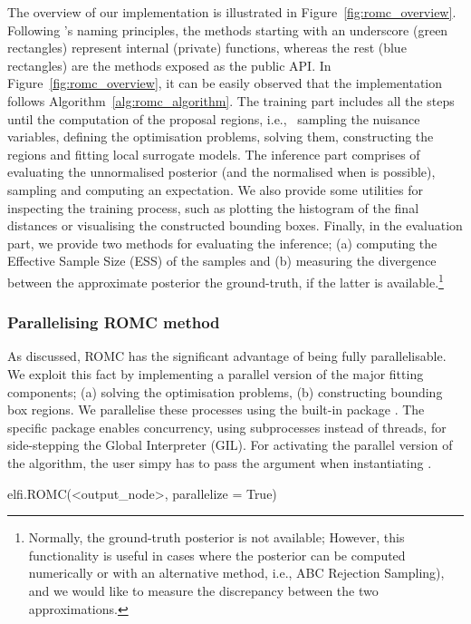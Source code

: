 

The overview of our implementation is illustrated in
Figure~\ref{fig:romc_overview}. Following 's naming
principles, the methods starting with an underscore (green rectangles)
represent internal (private) functions, whereas the rest (blue
rectangles) are the methods exposed as the public API. In
Figure~\ref{fig:romc_overview}, it can be easily observed that the
implementation follows Algorithm~\ref{alg:romc_algorithm}. The
training part includes all the steps until the computation of the
proposal regions, i.e., ~sampling the nuisance variables, defining the
optimisation problems, solving them, constructing the regions and
fitting local surrogate models. The inference part comprises of
evaluating the unnormalised posterior (and the normalised when is
possible), sampling and computing an expectation. We also provide some
utilities for inspecting the training process, such as plotting the
histogram of the final distances or visualising the constructed
bounding boxes. Finally, in the evaluation part, we provide two
methods for evaluating the inference; (a) computing the Effective
Sample Size (ESS) of the samples and (b) measuring the divergence
between the approximate posterior the ground-truth, if the latter is
available.\footnote{Normally, the ground-truth posterior is not
  available; However, this functionality is useful in cases where the
  posterior can be computed numerically or with an alternative method,
  i.e., ABC Rejection Sampling), and we would like to measure the
  discrepancy between the two approximations.}

\subsubsection*{Parallelising ROMC method}

As discussed, ROMC has the significant advantage of being fully
parallelisable. We exploit this fact by implementing a parallel
version of the major fitting components; (a) solving the optimisation
problems, (b) constructing bounding box regions. We parallelise these
processes using the built-in  package
. The specific package enables concurrency, using
subprocesses instead of threads, for side-stepping the Global
Interpreter (GIL). For activating the parallel version of the
algorithm, the user simpy has to pass the argument
 when instantiating .

\begin{Code}
elfi.ROMC(<output_node>, parallelize = True)
\end{Code}
  
